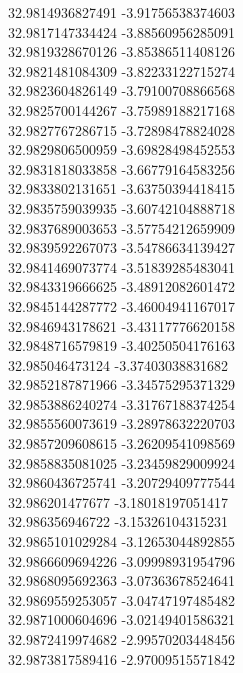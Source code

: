 {32.9814936827491	-3.91756538374603\\
32.9817147334424	-3.88560956285091\\
32.9819328670126	-3.85386511408126\\
32.9821481084309	-3.82233122715274\\
32.9823604826149	-3.79100708866568\\
32.9825700144267	-3.75989188217168\\
32.9827767286715	-3.72898478824028\\
32.9829806500959	-3.69828498452553\\
32.9831818033858	-3.66779164583256\\
32.9833802131651	-3.63750394418415\\
32.9835759039935	-3.60742104888718\\
32.9837689003653	-3.57754212659909\\
32.9839592267073	-3.54786634139427\\
32.9841469073774	-3.51839285483041\\
32.9843319666625	-3.48912082601472\\
32.9845144287772	-3.46004941167017\\
32.9846943178621	-3.43117776620158\\
32.9848716579819	-3.40250504176163\\
32.985046473124	-3.37403038831682\\
32.9852187871966	-3.34575295371329\\
32.9853886240274	-3.31767188374254\\
32.9855560073619	-3.28978632220703\\
32.9857209608615	-3.26209541098569\\
32.9858835081025	-3.23459829009924\\
32.9860436725741	-3.20729409777544\\
32.986201477677	-3.18018197051417\\
32.986356946722	-3.15326104315231\\
32.9865101029284	-3.12653044892855\\
32.9866609694226	-3.09998931954796\\
32.9868095692363	-3.07363678524641\\
32.9869559253057	-3.04747197485482\\
32.9871000604696	-3.02149401586321\\
32.9872419974682	-2.99570203448456\\
32.9873817589416	-2.97009515571842\\
}

